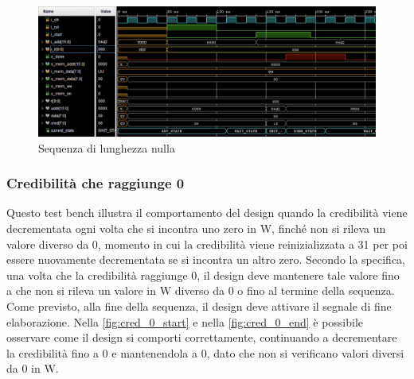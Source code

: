 \documentclass[11pt,a4paper]{article}
\newcommand{\m}[1]{{\scriptsize\fontfamily{fvm}\selectfont #1}}
\begin{document}
\vspace{0.5em}
\begin{figure}[htbp]
    \centering
    \includegraphics[width=\textwidth]{resources/empty_sequence.png}
    \caption{Sequenza di lunghezza nulla}
    \label{fig:empty_sequence}
\end{figure}
\subsubsection{Credibilità che raggiunge 0}

Questo test bench illustra il comportamento del design quando la credibilità viene decrementata ogni volta che si incontra uno zero in \m{W}, finché non si rileva un valore diverso da 0, momento in cui la credibilità viene reinizializzata a 31 per poi essere nuovamente decrementata se si incontra un altro zero. Secondo la specifica, una volta che la credibilità raggiunge 0, il design deve mantenere tale valore fino a che non si rileva un valore in \m{W} diverso da 0 o fino al termine della sequenza. Come previsto, alla fine della sequenza, il design deve attivare il segnale di fine elaborazione. Nella \autoref{fig:cred_0_start} e nella \autoref{fig:cred_0_end} è possibile osservare come il design si comporti correttamente, continuando a decrementare la credibilità fino a 0 e mantenendola a 0, dato che non si verificano valori diversi da 0 in \m{W}.
\end{document}
